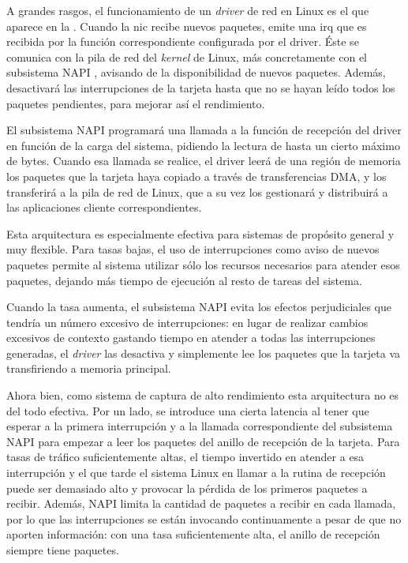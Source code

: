 \documentclass[twoside, 12pt]{epstfg}
\begin{document}
A grandes rasgos, el funcionamiento de un \textit{\gls{driver}} de red en Linux es el que aparece en la . Cuando la \gls{nic} recibe nuevos paquetes, emite una \gls{irq} que es recibida por la función correspondiente configurada por el \gls{driver}. Éste se comunica con la pila de red del \textit{kernel} de Linux, más concretamente con el subsistema \gls{NAPI} \cite{NAPI}, avisando de la disponibilidad de nuevos paquetes. Además, desactivará las interrupciones de la tarjeta hasta que no se hayan leído todos los paquetes pendientes, para mejorar así el rendimiento.

El subsistema \gls{NAPI} programará una llamada a la función de recepción del \gls{driver} en función de la carga del sistema, pidiendo la lectura de hasta un cierto máximo de bytes. Cuando esa llamada se realice, el \gls{driver} leerá de una región de memoria los paquetes que la tarjeta haya copiado a través de transferencias DMA, y los transferirá a la pila de red de Linux, que a su vez los gestionará y distribuirá a las aplicaciones cliente correspondientes.

Esta arquitectura es especialmente efectiva para sistemas de propósito general y muy flexible. Para tasas bajas, el uso de interrupciones como aviso de nuevos paquetes permite al sistema utilizar sólo los recursos necesarios para atender esos paquetes, dejando más tiempo de ejecución al resto de tareas del sistema.

Cuando la tasa aumenta, el subsistema NAPI evita los efectos perjudiciales que tendría un número excesivo de interrupciones: en lugar de realizar cambios excesivos de contexto gastando tiempo en atender a todas las interrupciones generadas, el \textit{driver} las desactiva y simplemente lee los paquetes que la tarjeta va transfiriendo a memoria principal.

Ahora bien, como sistema de captura de alto rendimiento esta arquitectura no es del todo efectiva. Por un lado, se introduce una cierta latencia al tener que esperar a la primera interrupción y a la llamada correspondiente del subsistema NAPI para empezar a leer los paquetes del anillo de recepción de la tarjeta. Para tasas de tráfico suficientemente altas, el tiempo invertido en atender a esa interrupción y el que tarde el sistema Linux en llamar a la rutina de recepción puede ser demasiado alto y provocar la pérdida de los primeros paquetes a recibir. Además, NAPI limita la cantidad de paquetes a recibir en cada llamada, por lo que las interrupciones se están invocando continuamente a pesar de que no aporten información: con una tasa suficientemente alta, el anillo de recepción siempre tiene paquetes.
\end{document}
